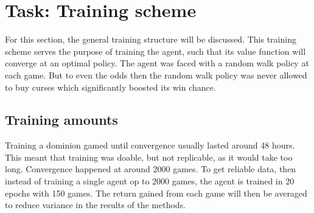 \chapter{Task: Training scheme} \label{ch:Dominion_engine}
For this section, the general training structure will be discussed. This training scheme serves the purpose of training the agent, such that its value function will converge at an optimal policy. The agent was faced with a random walk policy at each game. But to even the odds then the random walk policy was never allowed to buy curses which significantly boosted its win chance. 



\section{Training amounts}
Training a dominion gamed until convergence usually lasted around 48 hours. This meant that training was doable, but not replicable, as it would take too long. Convergence happened at around 2000 games. To get reliable data, then instead of training a single agent op to 2000 games, the agent is trained in 20 epochs with 150 games. The return gained from each game will then be averaged to reduce variance in the results of the methods.